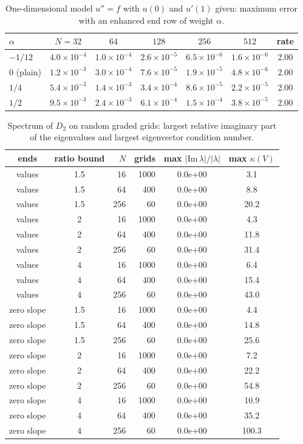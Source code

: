 \documentclass[11pt]{article}
\begin{document}
\begin{table}[htbp]\centering\small
\caption{One-dimensional model $u''=f$ with $u(0)$ and $u'(1)$ given: maximum error with an enhanced end row of weight $\alpha$.}
\begin{tabular}{l ccccc c}
\toprule
$\alpha$ & $N=32$ & $64$ & $128$ & $256$ & $512$ & rate\\
\midrule
$-1/12$ & $4.0{\times}10^{-4}$ & $1.0{\times}10^{-4}$ & $2.6{\times}10^{-5}$ & $6.5{\times}10^{-6}$ & $1.6{\times}10^{-6}$ & 2.00\\
0 (plain) & $1.2{\times}10^{-3}$ & $3.0{\times}10^{-4}$ & $7.6{\times}10^{-5}$ & $1.9{\times}10^{-5}$ & $4.8{\times}10^{-6}$ & 2.00\\
$1/4$ & $5.4{\times}10^{-3}$ & $1.4{\times}10^{-3}$ & $3.4{\times}10^{-4}$ & $8.6{\times}10^{-5}$ & $2.2{\times}10^{-5}$ & 2.00\\
$1/2$ & $9.5{\times}10^{-3}$ & $2.4{\times}10^{-3}$ & $6.1{\times}10^{-4}$ & $1.5{\times}10^{-4}$ & $3.8{\times}10^{-5}$ & 2.00\\
\bottomrule
\end{tabular}
\end{table}

\clearpage
\begin{table}[htbp]\centering\small
\caption{Spectrum of $D_2$ on random graded grids: largest relative imaginary part of the eigenvalues and largest eigenvector condition number.}
\begin{tabular}{cc r r cc}
\toprule
ends & ratio bound & $N$ & grids & max $|\mathrm{Im}\,\lambda|/|\lambda|$ & max $\kappa(V)$\\
\midrule
values & 1.5 & 16 & 1000 & 0.0e+00 & 3.1\\
values & 1.5 & 64 & 400 & 0.0e+00 & 8.8\\
values & 1.5 & 256 & 60 & 0.0e+00 & 20.2\\
values & 2 & 16 & 1000 & 0.0e+00 & 4.3\\
values & 2 & 64 & 400 & 0.0e+00 & 11.8\\
values & 2 & 256 & 60 & 0.0e+00 & 31.4\\
values & 4 & 16 & 1000 & 0.0e+00 & 6.4\\
values & 4 & 64 & 400 & 0.0e+00 & 15.4\\
values & 4 & 256 & 60 & 0.0e+00 & 43.0\\
zero slope & 1.5 & 16 & 1000 & 0.0e+00 & 4.4\\
zero slope & 1.5 & 64 & 400 & 0.0e+00 & 14.8\\
zero slope & 1.5 & 256 & 60 & 0.0e+00 & 25.6\\
zero slope & 2 & 16 & 1000 & 0.0e+00 & 7.2\\
zero slope & 2 & 64 & 400 & 0.0e+00 & 22.2\\
zero slope & 2 & 256 & 60 & 0.0e+00 & 54.8\\
zero slope & 4 & 16 & 1000 & 0.0e+00 & 10.9\\
zero slope & 4 & 64 & 400 & 0.0e+00 & 35.2\\
zero slope & 4 & 256 & 60 & 0.0e+00 & 100.3\\
\bottomrule
\end{tabular}
\end{table}
\end{document}
